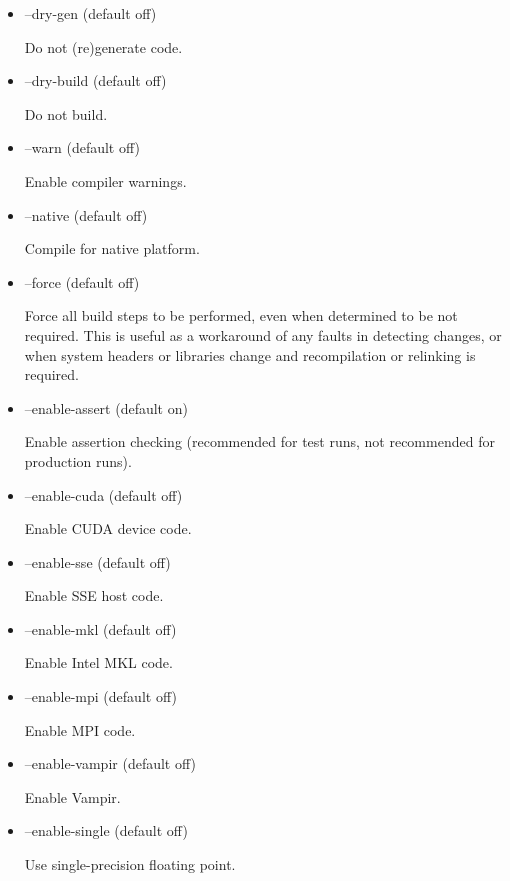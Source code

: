 \begin{itemize}
\item {\sf --dry-gen} (default off)

Do not (re)generate code.

\item {\sf --dry-build} (default off)

Do not build.

\item {\sf --warn} (default off)

Enable compiler warnings.

\item {\sf --native} (default off)

Compile for native platform.

\item {\sf --force} (default off)

Force all build steps to be performed, even when determined to be not
required. This is useful as a workaround of any faults in detecting
changes, or when system headers or libraries change and recompilation or
relinking is required.

\item {\sf --enable-assert} (default on)

Enable assertion checking (recommended for test runs, not recommended for
production runs).

\item {\sf --enable-cuda} (default off)

Enable CUDA device code.

\item {\sf --enable-sse} (default off)

Enable SSE host code.

\item {\sf --enable-mkl} (default off)

Enable Intel MKL code.

\item {\sf --enable-mpi} (default off)

Enable MPI code.

\item {\sf --enable-vampir} (default off)

Enable Vampir.

\item {\sf --enable-single} (default off)

Use single-precision floating point.
\end{itemize}

